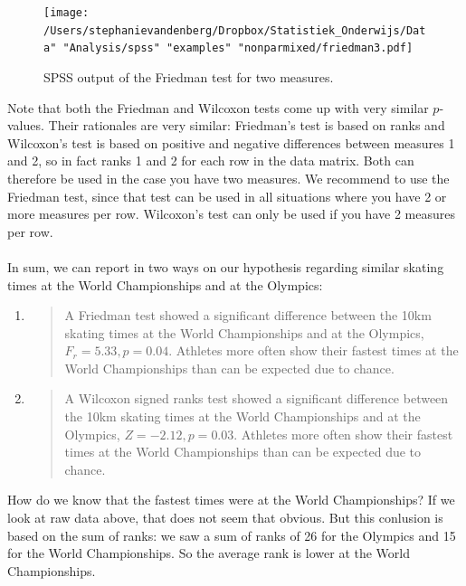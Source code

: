 \documentclass[]{book}\usepackage[]{graphicx}\usepackage[]{color}
\begin{document}
\begin{figure}[h]
    \begin{center}
       \texttt{[image: /Users/stephanievandenberg/Dropbox/Statistiek\_Onderwijs/Data" "Analysis/spss" "examples" "nonparmixed/friedman3.pdf]}
    \end{center}
    \caption{SPSS output of the Friedman test for two measures.}
    \label{fig:friedman3}
\end{figure}



Note that both the Friedman and Wilcoxon tests come up with very similar $p$-values. Their rationales are very similar: Friedman's test is based on ranks and Wilcoxon's test is based on positive and negative differences between measures 1 and 2, so in fact ranks 1 and 2 for each row in the data matrix. Both can therefore be used in the case you have two measures. We recommend to use the Friedman test, since that test can be used in all situations where you have 2 or more measures per row. Wilcoxon's test can only be used if you have 2 measures per row.
\\
\\
In sum, we can report in two ways on our hypothesis regarding similar skating times at the World Championships and at the Olympics:

\begin{enumerate}

\item

\begin{quotation}
A Friedman test showed a significant difference between the 10km skating times at the World Championships and at the Olympics, $F_r = 5.33, p=0.04$. Athletes more often show their fastest times at the World Championships than can be expected due to chance.
\end{quotation}

\item

\begin{quotation}
A Wilcoxon signed ranks test showed a significant difference between the 10km skating times at the World Championships and at the Olympics, $Z = -2.12, p=0.03$. Athletes more often show their fastest times at the World Championships than can be expected due to chance.
\end{quotation}

\end{enumerate}

How do we know that the fastest times were at the World Championships? If we look at raw data above, that does not seem that obvious. But this conlusion is based on the sum of ranks: we saw a sum of ranks of 26 for the Olympics and 15 for the World Championships. So the average rank is lower at the World Championships.
\end{document}
